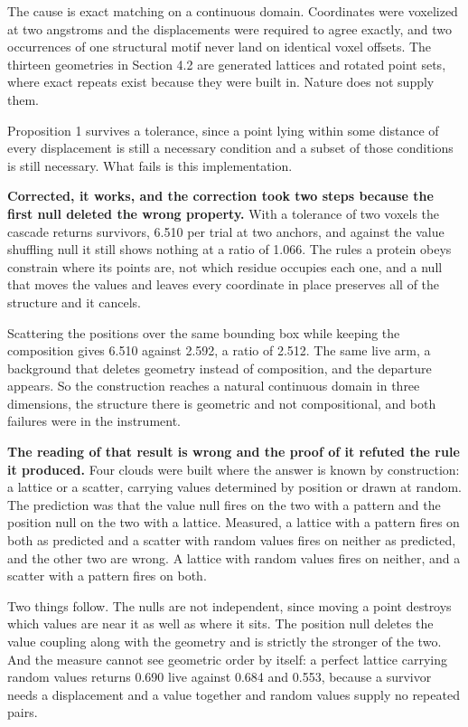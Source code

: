 The cause is exact matching on a continuous domain. Coordinates were voxelized at two angstroms and the displacements were required to agree exactly, and two occurrences of one structural motif never land on identical voxel offsets. The thirteen geometries in Section 4.2 are generated lattices and rotated point sets, where exact repeats exist because they were built in. Nature does not supply them.

Proposition 1 survives a tolerance, since a point lying within some distance of every displacement is still a necessary condition and a subset of those conditions is still necessary. What fails is this implementation.

\textbf{Corrected, it works, and the correction took two steps because the first null deleted the wrong property.} With a tolerance of two voxels the cascade returns survivors, 6.510 per trial at two anchors, and against the value shuffling null it still shows nothing at a ratio of 1.066. The rules a protein obeys constrain where its points are, not which residue occupies each one, and a null that moves the values and leaves every coordinate in place preserves all of the structure and it cancels.

Scattering the positions over the same bounding box while keeping the composition gives 6.510 against 2.592, a ratio of 2.512. The same live arm, a background that deletes geometry instead of composition, and the departure appears. So the construction reaches a natural continuous domain in three dimensions, the structure there is geometric and not compositional, and both failures were in the instrument.

\textbf{The reading of that result is wrong and the proof of it refuted the rule it produced.} Four clouds were built where the answer is known by construction: a lattice or a scatter, carrying values determined by position or drawn at random. The prediction was that the value null fires on the two with a pattern and the position null on the two with a lattice. Measured, a lattice with a pattern fires on both as predicted and a scatter with random values fires on neither as predicted, and the other two are wrong. A lattice with random values fires on neither, and a scatter with a pattern fires on both.

Two things follow. The nulls are not independent, since moving a point destroys which values are near it as well as where it sits. The position null deletes the value coupling along with the geometry and is strictly the stronger of the two. And the measure cannot see geometric order by itself: a perfect lattice carrying random values returns 0.690 live against 0.684 and 0.553, because a survivor needs a displacement and a value together and random values supply no repeated pairs.

